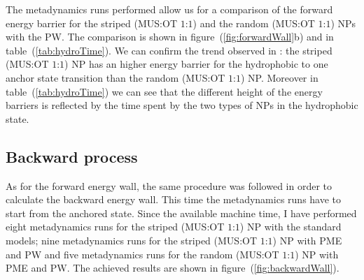 The metadynamics runs performed allow us for a comparison of the forward energy barrier for the striped (\ac{MUS}:\ac{OT} $1$:$1$) and the random (\ac{MUS}:\ac{OT} $1$:$1$) \acp{NP} with the \ac{PW}. The comparison is shown in figure~(\ref{fig:forwardWall}b) and in table~(\ref{tab:hydroTime}). We can confirm the trend observed in \cite{ourPaper}: the striped (\ac{MUS}:\ac{OT} $1$:$1$) \ac{NP} has an higher energy barrier for the hydrophobic to one anchor state transition than the random (\ac{MUS}:\ac{OT} $1$:$1$) \ac{NP}. Moreover in table~(\ref{tab:hydroTime}) we can see that the different height of the energy barriers is reflected by the time spent by the two types of \acp{NP} in the hydrophobic state. 


\subsection{Backward process}
As for the forward energy wall, the same procedure was followed in order to calculate the backward energy wall. This time the metadynamics runs have to start from the anchored state. Since the available machine time, I have performed eight metadynamics runs for the striped (\ac{MUS}:\ac{OT} $1$:$1$) \ac{NP} with the standard \martini models; nine metadynamics runs for the striped (\ac{MUS}:\ac{OT} $1$:$1$) \ac{NP} with \ac{PME} and \ac{PW} and five metadynamics runs for the random (\ac{MUS}:\ac{OT} $1$:$1$) \ac{NP} with \ac{PME} and \ac{PW}. The achieved results are shown in figure~(\ref{fig:backwardWall}).

